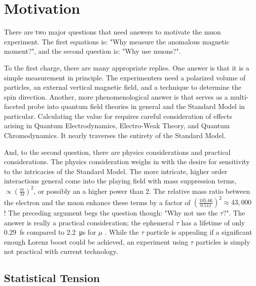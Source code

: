 \section{Motivation}

There are two major questions that need answers to motivate the muon \gmtwo experiment.  The first equations is: "Why measure the anomalous magnetic moment?", and the second question is: "Why use muons?".

To the first charge, there are many appropriate replies.  One answer is that it is a simple measurement in principle.  The experimenters need a polarized volume of particles, an external vertical magnetic field, and a technique to determine the spin direction. Another, more phenomenological answer is that \gmtwo serves as a multi-faceted probe into quantum field theories in general and the Standard Model in particular.  Calculating the value for \gmtwo requires careful consideration of effects arising in Quantum Electrodynamics, Electro-Weak Theory, and Quantum Chromodynamics.  It nearly traverses the entirety of the Standard Model.

And, to the second question, there are physics considerations and practical considerations.  The physics consideration weighs in with the desire for sensitivity to the intricacies of the Standard Model.  The more intricate, higher order interactions general come into the playing field with mass suppression terms, $\propto (\frac{m}{M})^2$, or possibly an a higher power than 2.  The relative mass ratio between the electron and the muon enhance these terms by a factor of $(\frac{105.66}{0.511})^2 \approx 43,000$ \cite{the-muon-g-2}!  The preceding argument begs the question though: "Why not use the $\tau$?".  The answer is really a practical consideration; the ephemeral $\tau$ has a lifetime of only \SI{0.29}{\femto\second} compared to \SI{2.2}{\micro\second} for $\mu$ \cite{codata}.  While the $\tau$ particle is appealing if a significant enough Lorenz boost could be achieved, an experiment using $\tau$ particles is simply not practical with current technology.

\subsection{Statistical Tension}

